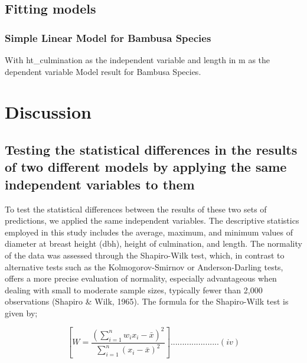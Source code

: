 \documentclass[preprint, 3p,
authoryear]{elsarticle} %
\begin{document}
\hypertarget{fitting-models}{%
\subsection{Fitting models}\label{fitting-models}}

\hypertarget{simple-linear-model-for-bambusa-species}{%
\subsubsection{Simple Linear Model for Bambusa
Species}\label{simple-linear-model-for-bambusa-species}}

With ht\_culmination as the independent variable and length in m as the
dependent variable Model result for Bambusa Species.

\hypertarget{discussion}{%
\section{Discussion}\label{discussion}}

\hypertarget{testing-the-statistical-differences-in-the-results-of-two-different-models-by-applying-the-same-independent-variables-to-them}{%
\subsection{Testing the statistical differences in the results of two
different models by applying the same independent variables to
them}\label{testing-the-statistical-differences-in-the-results-of-two-different-models-by-applying-the-same-independent-variables-to-them}}

To test the statistical differences between the results of these two
sets of predictions, we applied the same independent variables. The
descriptive statistics employed in this study includes the average,
maximum, and minimum values of diameter at breast height (dbh), height
of culmination, and length. The normality of the data was assessed
through the Shapiro-Wilk test, which, in contrast to alternative tests
such as the Kolmogorov-Smirnov or Anderson-Darling tests, offers a more
precise evaluation of normality, especially advantageous when dealing
with small to moderate sample sizes, typically fewer than 2,000
observations (Shapiro \& Wilk, 1965). The formula for the Shapiro-Wilk
test is given by;

\[[ W = \frac{{\left(\sum_{i=1}^{n} w_i x_i - \bar{x}\right)^2}}{{\sum_{i=1}^{n} (x_i - \bar{x})^2}}].....................(iv)\]
\end{document}
